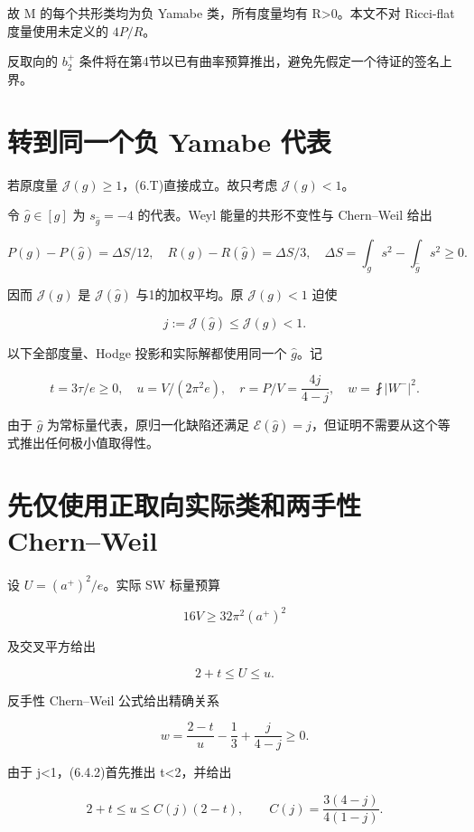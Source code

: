 \documentclass[UTF8,11pt,fontset=none]{ctexart}
\theoremstyle{definition}
\theoremstyle{remark}
\begin{document}
故 M 的每个共形类均为负 Yamabe 类，所有度量均有 R\textgreater0。本文不对 Ricci-flat 度量使用未定义的 \(4P/R\)。

反取向的 \(b_2^+\) 条件将在第4节以已有曲率预算推出，避免先假定一个待证的签名上界。

\section{转到同一个负 Yamabe 代表}\label{v6-ux8f6cux5230ux540cux4e00ux4e2aux8d1f-yamabe-ux4ee3ux8868}

若原度量 \(\mathcal J(g)\ge1\)，(6.T)直接成立。故只考虑 \(\mathcal J(g)<1\)。

令 \(\hat g\in[g]\) 为 \(s_{\hat g}=-4\) 的代表。Weyl 能量的共形不变性与 Chern--Weil 给出

\[
P(g)-P(\hat g)=\Delta S/12,\quad
R(g)-R(\hat g)=\Delta S/3,
\quad\Delta S=\int_gs^2-\int_{\hat g}s^2\ge0.
\]

因而 \(\mathcal J(g)\) 是 \(\mathcal J(\hat g)\) 与1的加权平均。原 \(\mathcal J(g)<1\) 迫使

\[
j:=\mathcal J(\hat g)\le\mathcal J(g)<1.
\tag{6.3.1}
\]

以下全部度量、Hodge 投影和实际解都使用同一个 \(\hat g\)。记

\[
t=3\tau/e\ge0,\quad u=V/(2\pi^2e),\quad
r=P/V=\frac{4j}{4-j},\quad
w=\fint|W^-|^2.
\tag{6.3.2}
\]

由于 \(\hat g\) 为常标量代表，原归一化缺陷还满足 \(\mathcal E(\hat g)=j\)，但证明不需要从这个等式推出任何极小值取得性。

\section{先仅使用正取向实际类和两手性 Chern--Weil}\label{v6-ux5148ux4ec5ux4f7fux7528ux6b63ux53d6ux5411ux5b9eux9645ux7c7bux548cux4e24ux624bux6027-chernweil}

设 \(U=(a^+)^2/e\)。实际 SW 标量预算

\[
16V\ge32\pi^2(a^+)^2
\]

及交叉平方给出

\[
2+t\le U\le u.
\tag{6.4.1}
\]

反手性 Chern--Weil 公式给出精确关系

\[
\boxed{w=\frac{2-t}{u}-\frac13+\frac{j}{4-j}\ge0.}
\tag{6.4.2}
\]

由于 j\textless1，(6.4.2)首先推出 t\textless2，并给出

\[
2+t\le u\le C(j)(2-t),\qquad
C(j)=\frac{3(4-j)}{4(1-j)}.
\tag{6.4.3}
\]
\end{document}

